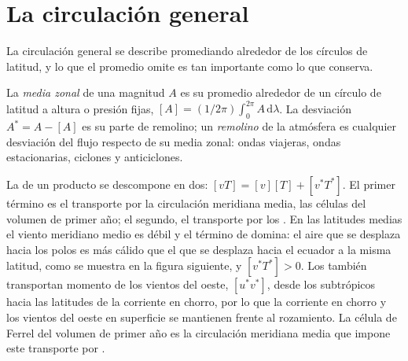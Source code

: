 \section{La circulación general}\label{sec:b3:atmospheric-dynamics:general-circulation}

La circulación general se describe promediando alrededor de los círculos de latitud,
y lo que el promedio omite es tan importante como lo que conserva.

\begin{definition}\label{def:b3:atmospheric-dynamics:eddy}
La \emph{media zonal} de una magnitud $A$ es su promedio
alrededor de un círculo de latitud a altura o presión fijas, $[A] =
(1/2\pi)\int_0^{2\pi} A\,\mathrm d\lambda$. La desviación $A^* = A - [A]$
es su parte de remolino; un \emph{remolino} de la
atmósfera es cualquier desviación del flujo respecto de su media zonal: ondas
viajeras, ondas estacionarias, ciclones y anticiclones.
\end{definition}

La  de un producto se descompone en dos: $[vT] = [v][T] + [v^*T^*]$. El
primer término es el transporte por la circulación meridiana media, las células
del volumen de primer año; el segundo, el transporte por los . En las
latitudes medias el viento meridiano medio es débil y el término de 
domina: el aire que se desplaza hacia los polos es más cálido que el que se desplaza hacia el ecuador a la
misma latitud, como se muestra en la figura siguiente, y $[v^*T^*] > 0$. Los  también
transportan momento de los vientos del oeste, $[u^*v^*]$, desde los subtrópicos hacia las latitudes
de la corriente en chorro, por lo que la corriente en chorro y los vientos del oeste en superficie se
mantienen frente al rozamiento. La célula de Ferrel del volumen de primer año es la
circulación meridiana media que impone este transporte por .

